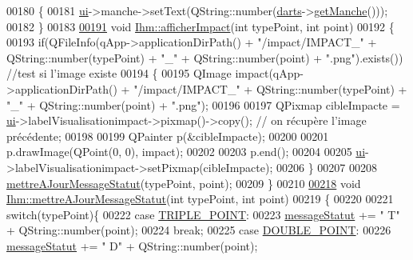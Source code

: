 \begin{DoxyCode}
00180 \{
00181     \hyperlink{class_ihm_a0ac5f47856566ceeeca1720109bf70ea}{ui}->manche->setText(QString::number(\hyperlink{class_ihm_a2a0f54d33f4d6b2531ec2190c4a2356e}{darts}->\hyperlink{class_darts_a2ce03c887d90f3a997648981d342b50c}{getManche}()));
00182 \}
00183 
\hyperlink{class_ihm_a591e686d87b027ac16e91b3b9867a58a}{00191} \textcolor{keywordtype}{void} \hyperlink{class_ihm_a591e686d87b027ac16e91b3b9867a58a}{Ihm::afficherImpact}(\textcolor{keywordtype}{int} typePoint, \textcolor{keywordtype}{int} point)
00192 \{
00193     \textcolor{keywordflow}{if}(QFileInfo(qApp->applicationDirPath() + \textcolor{stringliteral}{"/impact/IMPACT\_"} + QString::number(typePoint) + \textcolor{stringliteral}{"\_"} + 
      QString::number(point) + \textcolor{stringliteral}{".png"}).exists())       \textcolor{comment}{//test si l'image existe}
00194     \{
00195         QImage impact(qApp->applicationDirPath() + \textcolor{stringliteral}{"/impact/IMPACT\_"} + QString::number(typePoint) + \textcolor{stringliteral}{"\_"} + 
      QString::number(point) + \textcolor{stringliteral}{".png"});
00196 
00197         QPixmap cibleImpacte = \hyperlink{class_ihm_a0ac5f47856566ceeeca1720109bf70ea}{ui}->labelVisualisationimpact->pixmap()->copy(); \textcolor{comment}{// on récupère l'image
       précédente;}
00198 
00199         QPainter p(&cibleImpacte);
00200 
00201         p.drawImage(QPoint(0, 0), impact);
00202 
00203         p.end();
00204 
00205         \hyperlink{class_ihm_a0ac5f47856566ceeeca1720109bf70ea}{ui}->labelVisualisationimpact->setPixmap(cibleImpacte);
00206     \}
00207 
00208     \hyperlink{class_ihm_ab80e655c95fca8e1113343bdbd3d3586}{mettreAJourMessageStatut}(typePoint, point);
00209 \}
00210 
\hyperlink{class_ihm_ab80e655c95fca8e1113343bdbd3d3586}{00218} \textcolor{keywordtype}{void} \hyperlink{class_ihm_ab80e655c95fca8e1113343bdbd3d3586}{Ihm::mettreAJourMessageStatut}(\textcolor{keywordtype}{int} typePoint, \textcolor{keywordtype}{int} point)
00219 \{
00220 
00221     \textcolor{keywordflow}{switch}(typePoint)\{
00222         \textcolor{keywordflow}{case} \hyperlink{darts_8h_a1bd6caead3e7edd423f064b3af34e486}{TRIPLE\_POINT}:
00223             \hyperlink{class_ihm_a31a25b36e5560142cb156b8b1a25965f}{messageStatut} += \textcolor{stringliteral}{" T"} + QString::number(point);
00224         \textcolor{keywordflow}{break};
00225         \textcolor{keywordflow}{case} \hyperlink{darts_8h_af67ad443603f4dddf225d062757614ca}{DOUBLE\_POINT}:
00226             \hyperlink{class_ihm_a31a25b36e5560142cb156b8b1a25965f}{messageStatut} += \textcolor{stringliteral}{" D"} + QString::number(point);

\end{DoxyCode}
